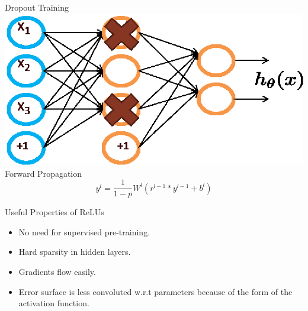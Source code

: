 \documentclass{beamer}
\begin{document}
\begin{frame}{Dropout}
{ Training}
\includegraphics[scale=0.5]{Figures/dropout.eps}
{ Forward Propagation}
$$y^{l} = \frac{1}{1-p}W^{l}(r^{l-1} * y^{l-1} + b^{l})$$
\end{frame}

\begin{frame}{Useful Properties of ReLUs}
\begin{itemize}
    \item No need for supervised pre-training.
    \item Hard sparsity in hidden layers.
    \item Gradients flow easily.
    \item Error surface is less convoluted w.r.t parameters because of the form of the activation function.
  \end{itemize}
\end{frame}
\end{document}
